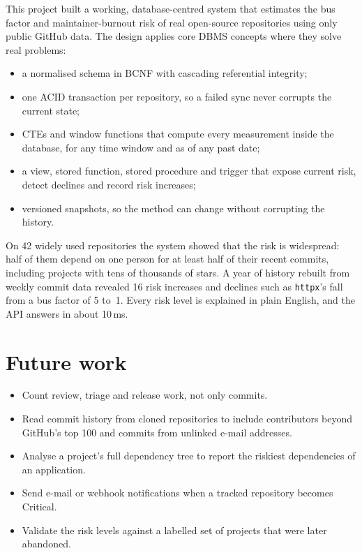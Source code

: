 \documentclass[11pt,a4paper]{report}
\begin{document}
This project built a working, database-centred system that estimates the bus
factor and maintainer-burnout risk of real open-source repositories using only
public GitHub data. The design applies core DBMS concepts where they solve real
problems:
\begin{itemize}
  \item a normalised schema in BCNF with cascading referential integrity;
  \item one ACID transaction per repository, so a failed sync never corrupts
        the current state;
  \item CTEs and window functions that compute every measurement inside the
        database, for any time window and as of any past date;
  \item a view, stored function, stored procedure and trigger that expose
        current risk, detect declines and record risk increases;
  \item versioned snapshots, so the method can change without corrupting the
        history.
\end{itemize}

On 42 widely used repositories the system showed that the risk is
widespread: half of them depend on one person for at least half of their
recent commits, including projects with tens of thousands of stars. A year of
history rebuilt from weekly commit data revealed 16 risk increases and declines
such as \texttt{httpx}'s fall from a bus factor of 5 to~1. Every risk level is
explained in plain English, and the API answers in about 10\,ms.

\section{Future work}

\begin{itemize}
  \item Count review, triage and release work, not only commits.
  \item Read commit history from cloned repositories to include contributors
        beyond GitHub's top 100 and commits from unlinked e-mail addresses.
  \item Analyse a project's full dependency tree to report the riskiest
        dependencies of an application.
  \item Send e-mail or webhook notifications when a tracked repository becomes
        Critical.
  \item Validate the risk levels against a labelled set of projects that were
        later abandoned.
\end{itemize}

\cleardoublepage
{}
{}


\end{document}
